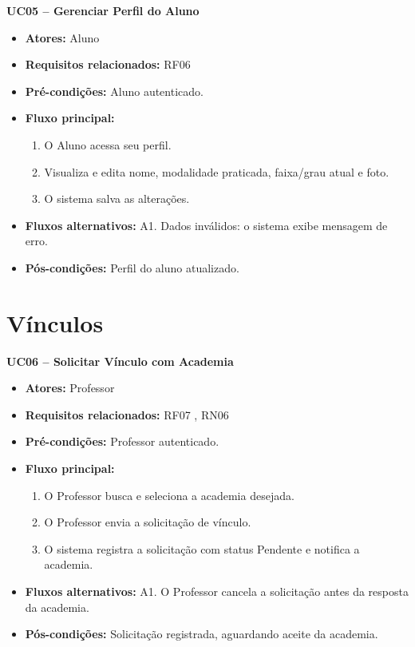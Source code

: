\noindent\textbf{UC05 -- Gerenciar Perfil do Aluno}
\begin{itemize}[leftmargin=*, itemsep=0pt, topsep=2pt]
  \item \textbf{Atores:} Aluno
  \item \textbf{Requisitos relacionados:} RF06
  \item \textbf{Pré-condições:} Aluno autenticado.
  \item \textbf{Fluxo principal:}
  \begin{enumerate}[label=\arabic*., itemsep=0pt, topsep=0pt]
    \item O Aluno acessa seu perfil.
    \item Visualiza e edita nome, modalidade praticada, faixa/grau atual e foto.
    \item O sistema salva as alterações.
  \end{enumerate}
  \item \textbf{Fluxos alternativos:} A1. Dados inválidos: o sistema exibe mensagem de erro.
  \item \textbf{Pós-condições:} Perfil do aluno atualizado.
\end{itemize}
\medskip

\section*{Vínculos}

\noindent\textbf{UC06 -- Solicitar Vínculo com Academia}
\begin{itemize}[leftmargin=*, itemsep=0pt, topsep=2pt]
  \item \textbf{Atores:} Professor
  \item \textbf{Requisitos relacionados:} RF07 , RN06
  \item \textbf{Pré-condições:} Professor autenticado.
  \item \textbf{Fluxo principal:}
  \begin{enumerate}[label=\arabic*., itemsep=0pt, topsep=0pt]
    \item O Professor busca e seleciona a academia desejada.
    \item O Professor envia a solicitação de vínculo.
    \item O sistema registra a solicitação com status Pendente e notifica a academia.
  \end{enumerate}
  \item \textbf{Fluxos alternativos:} A1. O Professor cancela a solicitação antes da resposta da academia.
  \item \textbf{Pós-condições:} Solicitação registrada, aguardando aceite da academia.
\end{itemize}
\medskip


